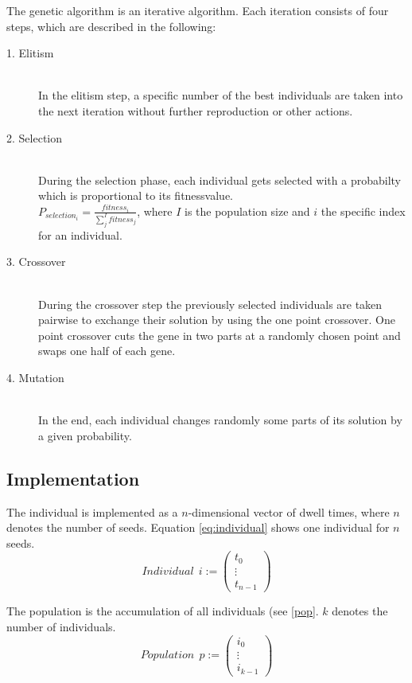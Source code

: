 \documentclass[12pt]{article}
\begin{document}
The genetic algorithm is an iterative algorithm. Each iteration consists of four steps, which are described in the following:

\begin{description}
\item[1. Elitism]~\\
In the elitism step, a specific number of the best individuals are taken into the next iteration without further reproduction or other actions. 
\item[2. Selection]~\\
During the selection phase, each individual gets selected with a probabilty which is proportional to its fitnessvalue.\\
$P_{selection_{i}}= \tfrac{fitness_{i}}{\sum_{j}^I fitness_{j}}$, where $I$ is the population size and $i$ the specific index for an individual.
\item[3. Crossover]~\\
During the crossover step the previously selected individuals are taken pairwise to exchange their solution by using the one point crossover. One point crossover cuts the gene in two parts at a randomly chosen point and swaps one half of each gene.



\item[4. Mutation]~\\
In the end, each individual changes randomly some parts of its solution by a given probability.
\end{description}

\subsection{Implementation}
\label{subsec:impl}

The individual is implemented as a $n$-dimensional vector of dwell times, where $n$ denotes the number of seeds. Equation \eqref{eq:individual} shows one individual for $n $ seeds.
 \begin{equation}
 \label{eq:individual}
 Individual \ \ i := \begin{pmatrix}
 t_{0} \\ \vdots \\ t_{n-1} 	
\end{pmatrix}   
\end{equation} 
 
 The population is the accumulation of all individuals (see \ref{pop}. $k$ denotes the number of individuals.
\begin{equation}
 \label{eq:population}
 Population \ \ p := \begin{pmatrix}
 i_{0} \\ \vdots \\ i_{k-1} 	
\end{pmatrix}   
 \end{equation}
 
\end{document}
